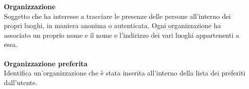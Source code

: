 \textbf{Organizzazione}\\
Soggetto che ha interesse a tracciare le presenze delle persone all’interno dei propri luoghi, in maniera anonima o autenticata. Ogni organizzazione ha associato un proprio nome e il nome e l'indirizzo dei vari luoghi appartenenti a essa. \\ \\
\textbf{Organizzazione preferita}\\
Identifica un'organizzazione che è stata inserita all'interno della lista dei preferiti dall'utente. \\ \\
\clearpage